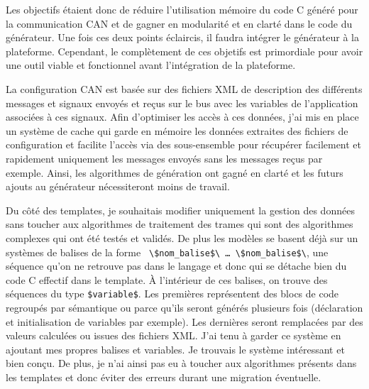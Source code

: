 Les objectifs étaient donc de réduire l'utilisation mémoire du code C
généré pour la communication CAN et de gagner en modularité et en clarté dans le
code du générateur. Une fois ces deux points éclaircis, il faudra intégrer le
générateur à la plateforme. Cependant, le complètement de ces objetifs est
primordiale pour avoir une outil viable et fonctionnel avant l'intégration de la
plateforme.

La configuration CAN est basée sur des fichiers XML de description des
différents messages et signaux envoyés et reçus sur le bus avec les variables
de l'application associées à ces signaux. Afin d'optimiser les accès à ces
données, j'ai mis en place un système de cache qui garde en mémoire les données
extraites des fichiers de configuration et facilite l'accès via des
sous-ensemble pour récupérer facilement et rapidement uniquement les messages
envoyés sans les messages reçus par exemple. Ainsi, les algorithmes de
génération ont gagné en clarté et les futurs ajouts au générateur nécessiteront
moins de travail.

Du côté des templates, je souhaitais modifier uniquement la gestion des données
sans toucher aux algorithmes de traitement des trames qui sont des algorithmes
complexes qui ont été testés et validés. De plus les modèles se basent déjà sur
un systèmes de balises de la forme {\tt
\textbackslash\$nom\_balise\$\textbackslash\- \ldots\-
\textbackslash\$nom\_balise\$\textbackslash}, une séquence qu'on ne retrouve pas
dans le langage et donc qui se détache bien du code C effectif dans le template.
À l'intérieur de ces balises, on trouve des séquences du type {\tt \$variable\$}.
Les premières représentent des blocs de code regroupés par sémantique ou parce
qu'ils seront générés plusieurs fois (déclaration et initialisation de variables
par exemple). Les dernières seront remplacées par des valeurs calculées ou
issues des fichiers XML. J'ai tenu à garder ce système en ajoutant mes propres
balises et variables. Je trouvais le système intéressant et bien conçu. De plus,
je n'ai ainsi pas eu à toucher aux algorithmes présents dans les templates et
donc éviter des erreurs durant une migration éventuelle.

